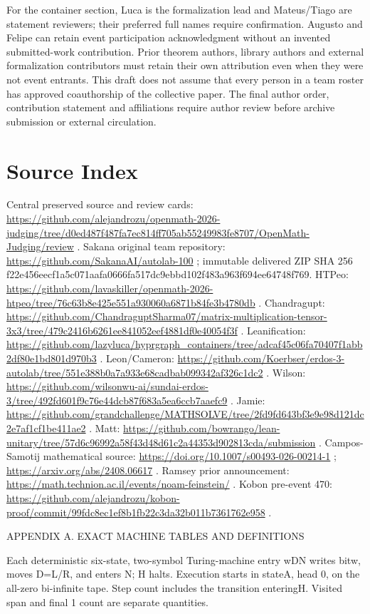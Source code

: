 \documentclass[11pt,a4paper]{article}
\begin{document}
For the container section, Luca is the formalization lead and Mateus/Tiago are statement reviewers; their preferred full names require confirmation. Augusto and Felipe can retain event participation acknowledgment without an invented submitted-work contribution. Prior theorem authors, library authors and external formalization contributors must retain their own attribution even when they were not event entrants. This draft does not assume that every person in a team roster has approved coauthorship of the collective paper. The final author order, contribution statement and affiliations require author review before archive submission or external circulation.

\section{Source Index}
Central preserved source and review cards: \url{https://github.com/alejandrozu/openmath-2026-judging/tree/d0ed487f487fa7ec814ff705ab55249983fe8707/OpenMath-Judging/review} .
Sakana original team repository: \url{https://github.com/SakanaAI/autolab-100} ; immutable delivered ZIP SHA 256 f22e456eecf1a5c071aafa0666fa517dc9ebbd102f483a963f694ee64748f769.
HTPeo: \url{https://github.com/lavaskiller/openmath-2026-htpeo/tree/76c63b8e425e551a930060a6871b84fe3b4780db} .
Chandragupt: \url{https://github.com/ChandraguptSharma07/matrix-multiplication-tensor-3x3/tree/479c2416b6261ee841052eef4881df0e40054f3f} .
Leanification: \url{https://github.com/lazyluca/hyprgraph_containers/tree/adcaf45c06fa70407f1abb2df80e1bd801d970b3} .
Leon/Cameron: \url{https://github.com/Koerbser/erdos-3-autolab/tree/551e388b0a7a933e68cadbab099342af326c1dc2} .
Wilson: \url{https://github.com/wilsonwu-ai/sundai-erdos-3/tree/492fd601f9c76e44dcb87f683a5ea6ccb7aaefc9} .
Jamie: \url{https://github.com/grandchallenge/MATHSOLVE/tree/2fd9fd643bf3e9e98d121dc2e7af1cf1be411ae2} .
Matt: \url{https://github.com/bowrango/lean-unitary/tree/57d6c96992a58f43d48d61c2a44353d902813cda/submission} .
Campos-Samotij mathematical source: \url{https://doi.org/10.1007/s00493-026-00214-1} ; \url{https://arxiv.org/abs/2408.06617} .
Ramsey prior announcement: \url{https://math.technion.ac.il/events/noam-feinstein/} .
Kobon pre-event 470: \url{https://github.com/alejandrozu/kobon-proof/commit/99fdc8ec1ef8b1fb22c3da32b011b7361762e958} .

APPENDIX A. EXACT MACHINE TABLES AND DEFINITIONS

Each deterministic six-state, two-symbol Turing-machine entry wDN writes bitw, moves D=L/R, and enters N; H halts. Execution starts in stateA, head 0, on the all-zero bi-infinite tape. Step count includes the transition enteringH. Visited span and final 1 count are separate quantities.
\end{document}
